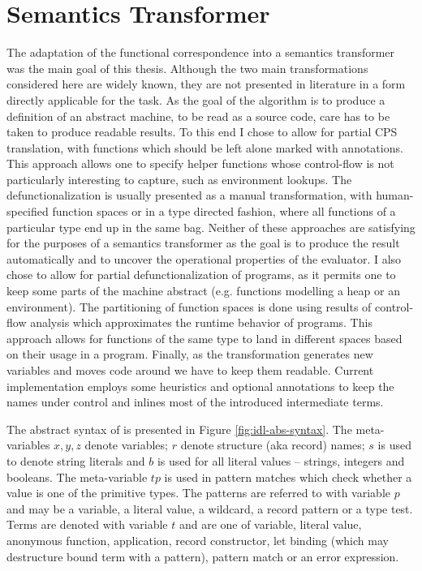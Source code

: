 \chapter{Semantics Transformer}\label{chapter:transformer}
The adaptation of the functional correspondence into a semantics transformer was the main goal of this thesis.
Although the two main transformations considered here are widely known, they are not presented in literature in a form directly applicable for the task.
As the goal of the algorithm is to produce a definition of an abstract machine, to be read as a source code, care has to be taken to produce readable results.
To this end I chose to allow for partial CPS translation, with functions which should be left alone marked with annotations.
This approach allows one to specify helper functions whose control-flow is not particularly interesting to capture, such as environment lookups.
The defunctionalization is usually presented as a manual transformation, with human-specified function spaces or in a type directed fashion, where all functions of a particular type end up in the same bag.
Neither of these approaches are satisfying for the purposes of a semantics transformer as the goal is to produce the result automatically and to uncover the operational properties of the evaluator.
I also chose to allow for partial defunctionalization of programs, as it permits one to keep some parts of the machine abstract (e.g. functions modelling a heap or an environment).
The partitioning of function spaces is done using results of control-flow analysis which approximates the runtime behavior of programs.
This approach allows for functions of the same type to land in different spaces based on their usage in a program.
Finally, as the transformation generates new variables and moves code around we have to keep them readable.
Current implementation employs some heuristics and optional annotations to keep the names under control and inlines most of the introduced intermediate terms.

The abstract syntax of \IDL{} is presented in Figure \ref{fig:idl-abs-syntax}.
The meta-variables $x, y, z$ denote variables; $r$ denote structure (aka record) names; $s$ is used to denote string literals and $b$ is used for all literal values -- strings, integers and booleans.
The meta-variable $\mathit{tp}$ is used in pattern matches which check whether a value is one of the primitive types.
The patterns are referred to with variable $p$ and may be a variable, a literal value, a wildcard, a record pattern or a type test.
Terms are denoted with variable $t$ and are one of variable, literal value, anonymous function, application, record constructor, let binding (which may destructure bound term with a pattern), pattern match or an error expression.

